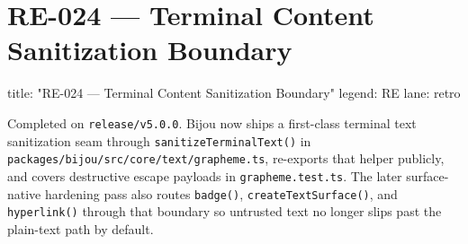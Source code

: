 \chapter{RE-024 --- Terminal Content Sanitization Boundary}\label{record-381}

\smallskip

\begin{RecordMeta}
title: "RE-024 — Terminal Content Sanitization Boundary"
legend: RE
lane: retro

\end{RecordMeta}

Completed on \texttt{r\allowbreak{}e\allowbreak{}l\allowbreak{}e\allowbreak{}a\allowbreak{}s\allowbreak{}e\allowbreak{}/\allowbreak{}v\allowbreak{}5\allowbreak{}.\allowbreak{}0\allowbreak{}.\allowbreak{}0}. Bijou now ships a first-class terminal text sanitization seam through \texttt{s\allowbreak{}a\allowbreak{}n\allowbreak{}i\allowbreak{}t\allowbreak{}i\allowbreak{}z\allowbreak{}e\allowbreak{}T\allowbreak{}e\allowbreak{}r\allowbreak{}m\allowbreak{}i\allowbreak{}n\allowbreak{}a\allowbreak{}l\allowbreak{}T\allowbreak{}e\allowbreak{}x\allowbreak{}t\allowbreak{}(\allowbreak{})} in \texttt{p\allowbreak{}a\allowbreak{}c\allowbreak{}k\allowbreak{}a\allowbreak{}g\allowbreak{}e\allowbreak{}s\allowbreak{}/\allowbreak{}b\allowbreak{}i\allowbreak{}j\allowbreak{}o\allowbreak{}u\allowbreak{}/\allowbreak{}s\allowbreak{}r\allowbreak{}c\allowbreak{}/\allowbreak{}c\allowbreak{}o\allowbreak{}r\allowbreak{}e\allowbreak{}/\allowbreak{}t\allowbreak{}e\allowbreak{}x\allowbreak{}t\allowbreak{}/\allowbreak{}g\allowbreak{}r\allowbreak{}a\allowbreak{}p\allowbreak{}h\allowbreak{}e\allowbreak{}m\allowbreak{}e\allowbreak{}.\allowbreak{}t\allowbreak{}s}, re-exports that helper publicly, and covers destructive escape payloads in \texttt{g\allowbreak{}r\allowbreak{}a\allowbreak{}p\allowbreak{}h\allowbreak{}e\allowbreak{}m\allowbreak{}e\allowbreak{}.\allowbreak{}t\allowbreak{}e\allowbreak{}s\allowbreak{}t\allowbreak{}.\allowbreak{}t\allowbreak{}s}. The later surface-native hardening pass also routes \texttt{b\allowbreak{}a\allowbreak{}d\allowbreak{}g\allowbreak{}e\allowbreak{}(\allowbreak{})}, \texttt{c\allowbreak{}r\allowbreak{}e\allowbreak{}a\allowbreak{}t\allowbreak{}e\allowbreak{}T\allowbreak{}e\allowbreak{}x\allowbreak{}t\allowbreak{}S\allowbreak{}u\allowbreak{}r\allowbreak{}f\allowbreak{}a\allowbreak{}c\allowbreak{}e\allowbreak{}(\allowbreak{})}, and \texttt{h\allowbreak{}y\allowbreak{}p\allowbreak{}e\allowbreak{}r\allowbreak{}l\allowbreak{}i\allowbreak{}n\allowbreak{}k\allowbreak{}(\allowbreak{})} through that boundary so untrusted text no longer slips past the plain-text path by default.

